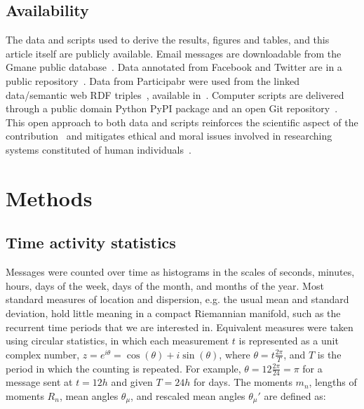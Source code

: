 \documentclass[%
aip,
jmp,%
amsmath,amssymb,
reprint,%
]{revtex4-1}
\begin{document}
\subsection{Availability}
The data and scripts used to derive the results, figures and tables, and this article itself are publicly available. Email messages are downloadable from the Gmane public database~\cite{Gmanewikipedia}.
Data annotated from Facebook and Twitter are in a public repository~\cite{fbtwData}. Data from Participabr were used from the linked data/semantic web RDF triples~\cite{opa}, available in~\cite{datahub}. Computer scripts are delivered through a public domain Python PyPI package and an open Git repository~\cite{gmanePack}.
This open approach to both data and scripts reinforces the scientific aspect of the contribution~\cite{openSci} and mitigates ethical and moral issues involved in researching systems constituted of human individuals~\cite{anPhy,ccs15}.

\section{Methods}\label{sec:carac}

\subsection{Time activity statistics}\label{sec:mtime}
Messages were counted over time as histograms in the scales of seconds,
minutes, hours, days of the week, days of the month, and months of the year.
Most standard measures of location and dispersion, e.g. the usual mean and
standard deviation, hold little meaning in a compact Riemannian manifold,
such as the recurrent time periods that we are interested in.
Equivalent measures were taken using circular statistics,
in which each measurement $t$ is represented as a unit complex number,
$z=e^{i\theta}=\cos(\theta)+i\sin(\theta)$, where $\theta=t\frac{2\pi}{T}$,
and $T$ is the period in which the counting is repeated.
For example, $\theta=12\frac{2\pi}{24}=\pi$ for a message sent at $t=12h$ and given $T=24h$ for days.
The moments $m_n$, lengths of moments $R_n$, mean angles $\theta_\mu$, and rescaled mean angles $\theta_\mu'$ are defined as:
\end{document}
